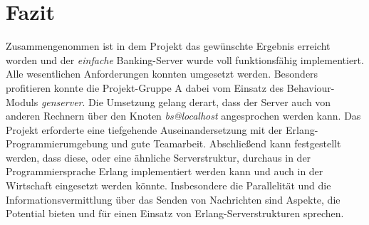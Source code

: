 \section{Fazit}

Zusammengenommen ist in dem Projekt das gewünschte Ergebnis erreicht worden und der \textit{einfache} Banking-Server wurde voll funktionsfähig implementiert. Alle wesentlichen Anforderungen konnten umgesetzt werden. Besonders profitieren konnte die Projekt-Gruppe A dabei vom Einsatz des Behaviour-Moduls \textit{gen\textunderscore server}. Die Umsetzung gelang derart, dass der Server auch von anderen Rechnern über den Knoten \textit{bs@localhost} angesprochen werden kann. Das Projekt erforderte eine tiefgehende Auseinandersetzung mit der Erlang-Programmierumgebung und gute Teamarbeit. Abschließend kann festgestellt werden, dass diese, oder eine ähnliche Serverstruktur, durchaus in der Programmiersprache Erlang implementiert werden kann und auch in der Wirtschaft eingesetzt werden könnte. Insbesondere die Parallelität und die Informationsvermittlung über das Senden von Nachrichten sind Aspekte, die Potential bieten und für einen Einsatz von Erlang-Serverstrukturen sprechen.
